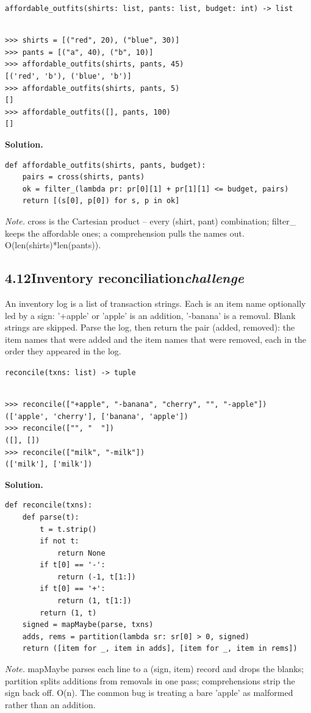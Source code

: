 \documentclass[10pt,letterpaper]{book}
\begin{document}
\noindent\texttt{affordable\_outfits(shirts: list, pants: list, budget: int) -> list}
\begin{lstlisting}[style=ex]

>>> shirts = [("red", 20), ("blue", 30)]
>>> pants = [("a", 40), ("b", 10)]
>>> affordable_outfits(shirts, pants, 45)
[('red', 'b'), ('blue', 'b')]
>>> affordable_outfits(shirts, pants, 5)
[]
>>> affordable_outfits([], pants, 100)
[]

\end{lstlisting}
\noindent\textbf{Solution.}
\begin{lstlisting}[style=code]
def affordable_outfits(shirts, pants, budget):
    pairs = cross(shirts, pants)
    ok = filter_(lambda pr: pr[0][1] + pr[1][1] <= budget, pairs)
    return [(s[0], p[0]) for s, p in ok]
\end{lstlisting}
\noindent\textit{Note.} cross is the Cartesian product -- every (shirt, pant) combination; filter\_ keeps the affordable ones; a comprehension pulls the names out. O(len(shirts)*len(pants)).

\subsection*{4.12\quad Inventory reconciliation\hfill\textnormal{\textit{challenge}}}
An inventory log is a list of transaction strings. Each is an item name optionally led by a sign: '+apple' or 'apple' is an addition, '-banana' is a removal. Blank strings are skipped. Parse the log, then return the pair (added, removed): the item names that were added and the item names that were removed, each in the order they appeared in the log.

\noindent\texttt{reconcile(txns: list) -> tuple}
\begin{lstlisting}[style=ex]

>>> reconcile(["+apple", "-banana", "cherry", "", "-apple"])
(['apple', 'cherry'], ['banana', 'apple'])
>>> reconcile(["", "  "])
([], [])
>>> reconcile(["milk", "-milk"])
(['milk'], ['milk'])

\end{lstlisting}
\noindent\textbf{Solution.}
\begin{lstlisting}[style=code]
def reconcile(txns):
    def parse(t):
        t = t.strip()
        if not t:
            return None
        if t[0] == '-':
            return (-1, t[1:])
        if t[0] == '+':
            return (1, t[1:])
        return (1, t)
    signed = mapMaybe(parse, txns)
    adds, rems = partition(lambda sr: sr[0] > 0, signed)
    return ([item for _, item in adds], [item for _, item in rems])
\end{lstlisting}
\noindent\textit{Note.} mapMaybe parses each line to a (sign, item) record and drops the blanks; partition splits additions from removals in one pass; comprehensions strip the sign back off. O(n). The common bug is treating a bare 'apple' as malformed rather than an addition.
\end{document}
